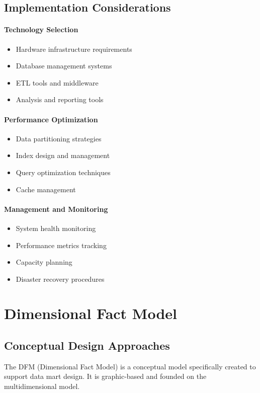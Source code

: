 \documentclass[a4paper,11pt]{article}
\newcommand{\definition}[1]{
  \begin{tcolorbox}[colback=blue!5,colframe=blue!40!black,title=Definition]
    #1
  \end{tcolorbox}
}
\begin{document}
\subsection{Implementation Considerations}

\paragraph{Technology Selection}
\begin{itemize}
    \item Hardware infrastructure requirements
    \item Database management systems
    \item ETL tools and middleware
    \item Analysis and reporting tools
\end{itemize}

\paragraph{Performance Optimization}
\begin{itemize}
    \item Data partitioning strategies
    \item Index design and management
    \item Query optimization techniques
    \item Cache management
\end{itemize}

\paragraph{Management and Monitoring}
\begin{itemize}
    \item System health monitoring
    \item Performance metrics tracking
    \item Capacity planning
    \item Disaster recovery procedures
\end{itemize}

\section{Dimensional Fact Model}

\subsection{Conceptual Design Approaches}
\definition{
The DFM (Dimensional Fact Model) is a conceptual model specifically created to support data mart design. It is graphic-based and founded on the multidimensional model.
}
\end{document}
